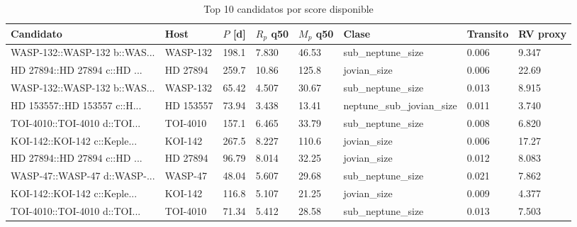 \begin{table}[H]
\centering
\caption{Top 10 candidatos por score disponible}
\label{tab:top-candidates}
\scriptsize
\begin{tabular}{llllllll}
\toprule
Candidato & Host & $P$ [d] & $R_p$ q50 & $M_p$ q50 & Clase & Transito & RV proxy \\
\midrule
WASP-132::WASP-132 b::WAS... & WASP-132 & 198.1 & 7.830 & 46.53 & sub\_neptune\_size & 0.006 & 9.347 \\
HD 27894::HD 27894 c::HD ... & HD 27894 & 259.7 & 10.86 & 125.8 & jovian\_size & 0.006 & 22.69 \\
WASP-132::WASP-132 b::WAS... & WASP-132 & 65.42 & 4.507 & 30.67 & sub\_neptune\_size & 0.013 & 8.915 \\
HD 153557::HD 153557 c::H... & HD 153557 & 73.94 & 3.438 & 13.41 & neptune\_sub\_jovian\_size & 0.011 & 3.740 \\
TOI-4010::TOI-4010 d::TOI... & TOI-4010 & 157.1 & 6.465 & 33.79 & sub\_neptune\_size & 0.008 & 6.820 \\
KOI-142::KOI-142 c::Keple... & KOI-142 & 267.5 & 8.227 & 110.6 & jovian\_size & 0.006 & 17.27 \\
HD 27894::HD 27894 c::HD ... & HD 27894 & 96.79 & 8.014 & 32.25 & jovian\_size & 0.012 & 8.083 \\
WASP-47::WASP-47 d::WASP-... & WASP-47 & 48.04 & 5.607 & 29.68 & sub\_neptune\_size & 0.021 & 7.862 \\
KOI-142::KOI-142 c::Keple... & KOI-142 & 116.8 & 5.107 & 21.25 & jovian\_size & 0.009 & 4.377 \\
TOI-4010::TOI-4010 d::TOI... & TOI-4010 & 71.34 & 5.412 & 28.58 & sub\_neptune\_size & 0.013 & 7.503 \\
\bottomrule
\end{tabular}
\end{table}
